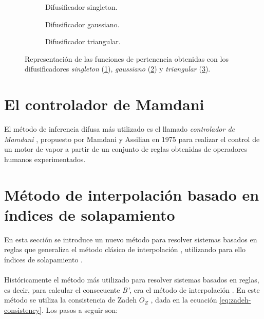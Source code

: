 \begin{figure}[H]
	\centering
	\begin{subfigure}[t]{\textwidth}
		\setlength\figureheight{4cm}
		\setlength\figurewidth{12cm}
		
		\caption{Difusificador singleton.}
		\label{fig:fuzzifier-singleton}
	\end{subfigure}
	
	\vspace{1 cm}
	\begin{subfigure}[t]{\textwidth}
		\setlength\figureheight{4cm}
		\setlength\figurewidth{12cm}
		
		\caption{Difusificador gaussiano.}
		\label{fig:fuzzifier-gaussian}
	\end{subfigure}
	
	\vspace{1 cm}
	\begin{subfigure}[t]{\textwidth}
		\setlength\figureheight{4cm}
		\setlength\figurewidth{12cm}
		
		\caption{Difusificador triangular.}
		\label{fig:fuzzifier-triangular}
	\end{subfigure}
		\caption{Representación de las funciones de pertenencia obtenidas con los difusificadores \emph{singleton} (\ref{fig:fuzzifier-singleton}), \emph{gaussiano} (\ref{fig:fuzzifier-gaussian}) y \emph{triangular} (\ref{fig:fuzzifier-triangular}).}
		\label{fig:fuzzifiers}
\end{figure}

\section{El controlador de Mamdani}
El método de inferencia difusa más utilizado es el llamado \emph{controlador de Mamdani} \cite{Mamdani1975}, propuesto por Mamdani y Assilian en 1975 para realizar el control de un motor de vapor a partir de un conjunto de reglas obtenidas de operadores humanos experimentados.
\section{Método de interpolación basado en índices de solapamiento}
En esta sección se introduce un nuevo método para resolver sistemas basados en reglas que generaliza el método clásico de interpolación , utilizando para ello índices de solapamiento \cite{bustince2013overlap}.\\
\\
Históricamente el método más utilizado para resolver sistemas basados en reglas, es decir, para calcular el consecuente \emph{B'}, era el método de interpolación \cite{klir1987}. En este método se utiliza la consistencia de Zadeh \emph{$O_{Z}$} \cite{zadeh1978}, dada en la ecuación \ref{eq:zadeh-consistency}. Los pasos a seguir son:

